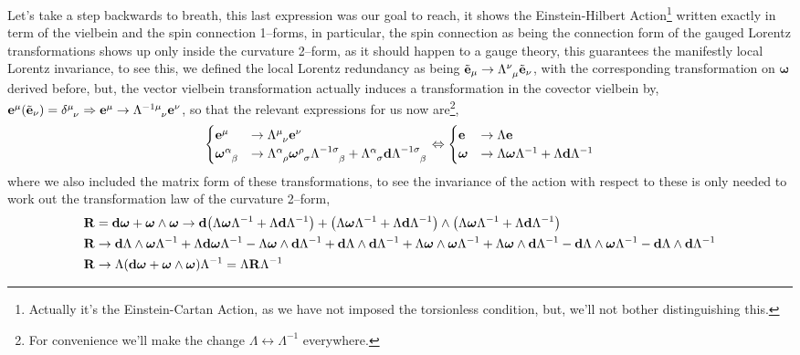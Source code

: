 Let's take a step backwards to breath, this last expression was our goal to reach, it shows the Einstein-Hilbert Action\footnote{Actually it's the Einstein-Cartan Action, as we have not imposed the torsionless condition, but, we'll not bother distinguishing this.} 
written exactly in term of the vielbein and the spin connection 1--forms, in particular, the spin connection as being the connection form of the gauged Lorentz transformations shows up only inside the curvature 2--form, as 
it should happen to a gauge theory, this guarantees the manifestly local Lorentz invariance, to see this, we defined the local Lorentz redundancy as being $\tilde{\vb e}_\mu\rightarrow \tensor{\Lambda}{^\nu_\mu}\tilde{\vb e}_\nu$, with the corresponding 
transformation on $\boldsymbol\omega$ derived before, but, the vector vielbein transformation actually induces a transformation in the covector vielbein by, $\vb e^\mu\qty(\tilde{\vb e}_\nu)=\tensor{\delta}{^\mu_\nu}\Rightarrow \vb e^\mu\rightarrow \tensor{\Lambda}{^{-1}^\mu_\nu}\vb e^\nu$, so that the 
relevant expressions for us now are\footnote{For convenience we'll make the change $\Lambda\leftrightarrow\Lambda^{-1}$ everywhere.},
\begin{align*}
    \begin{cases}
        \vb e^\mu&\rightarrow\tensor{\Lambda}{^\mu_\nu}\vb e^\nu\\
        \tensor{\boldsymbol\omega}{^\alpha_\beta}&\rightarrow\tensor{\Lambda}{^\alpha_\rho}\tensor{\boldsymbol\omega}{^\rho_\sigma}\tensor{\Lambda}{^{-1}^\sigma_\beta}+\tensor{\Lambda}{^\alpha_\sigma}\vb d\tensor{\Lambda}{^{-1}^\sigma_\beta}
    \end{cases}\Leftrightarrow\begin{cases}
        \vb e&\rightarrow\Lambda\vb e\\
        \boldsymbol\omega&\rightarrow\Lambda\boldsymbol\omega\Lambda^{-1}+\Lambda\vb d\Lambda^{-1}
    \end{cases} 
\end{align*}
where we also included the matrix form of these transformations, to see the invariance of the action with respect to these is only needed to work out the transformation law of the curvature 2--form,
\begin{align*}
    \vb R&=\vb d\boldsymbol\omega+\boldsymbol\omega\wedge\boldsymbol\omega\rightarrow \vb d\qty(\Lambda\boldsymbol\omega\Lambda^{-1}+\Lambda\vb d\Lambda^{-1})+\qty(\Lambda\boldsymbol\omega\Lambda^{-1}+\Lambda\vb d\Lambda^{-1})\wedge\qty(\Lambda\boldsymbol\omega\Lambda^{-1}+\Lambda\vb d\Lambda^{-1})\\
    \vb R&\rightarrow \vb d\Lambda\wedge\boldsymbol\omega\Lambda^{-1}+\Lambda\vb d\boldsymbol\omega\Lambda^{-1}-\Lambda\boldsymbol\omega\wedge\vb d\Lambda^{-1}+\vb d\Lambda\wedge\vb d\Lambda^{-1}+\Lambda\boldsymbol\omega\wedge\boldsymbol\omega\Lambda^{-1}+\Lambda\boldsymbol\omega\wedge\vb d\Lambda^{-1}-\vb d\Lambda\wedge\boldsymbol\omega\Lambda^{-1}-\vb d\Lambda\wedge\vb d\Lambda^{-1}\\
    \vb R&\rightarrow \Lambda\qty(\vb d\boldsymbol\omega+\boldsymbol\omega\wedge\boldsymbol\omega)\Lambda^{-1}=\Lambda\vb R\Lambda^{-1}
\end{align*}
